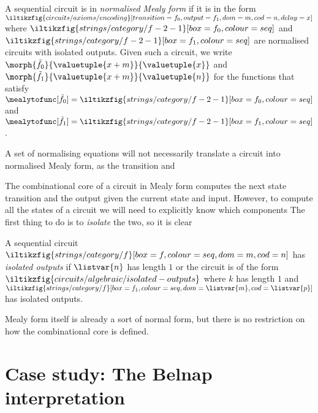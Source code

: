 \begin{definition}
    A sequential circuit is in \emph{normalised Mealy form} if it is in the form
    \(
        \iltikzfig{circuits/axioms/encoding}[transition={f_0},output={f_1},dom=m,cod=n,delay=x]
    \) where \(
        \iltikzfig{strings/category/f-2-1}[box=f_0,colour=seq]
    \) and \(
        \iltikzfig{strings/category/f-2-1}[box=f_1,colour=seq]
    \) are normalised circuits with isolated outputs.
    Given such a circuit, we write \(
        \morph{\tilde{f}_{0}}{\valuetuple{x+m}}{{\valuetuple{x}}}
    \) and \(
        \morph{\tilde{f}_{1}}{\valuetuple{x+m}}{{\valuetuple{n}}}
    \) for the functions that satisfy \(
        \mealytofunc[\tilde{f}_{0}] = \iltikzfig{strings/category/f-2-1}[box=f_0,colour=seq]
    \) and \(
        \mealytofunc[\tilde{f}_{1}] = \iltikzfig{strings/category/f-2-1}[box=f_1,colour=seq]
    \).
\end{definition}

A set of normalising equations will not necessarily translate a circuit into
normalised Mealy form, as the transition and



The combinational core of a circuit in Mealy form computes the next state
transition and the output given the current state and input.
However, to compute all the states of a circuit we will need to explicitly know
which components
The first thing to do is to \emph{isolate} the two, so it is clear

\begin{definition}
    A sequential circuit \(
        \iltikzfig{strings/category/f}[box=f,colour=seq,dom=m,cod=n]
    \) has \emph{isolated outputs} if \(\listvar{n}\) has length \(1\) or the
    circuit is of the form \(
        \iltikzfig{circuits/algebraic/isolated-outputs}
    \) where \(k\) has length \(1\) and \(
        \iltikzfig{strings/category/f}[box=f_1,colour=seq,dom=\listvar{m},cod=\listvar{p}]
    \) has isolated outputs.
\end{definition}

\begin{example}
\end{example}



Mealy form itself is already a sort of normal form, but there is no restriction
on how the combinational core is defined.


\section{Case study: The Belnap interpretation}

